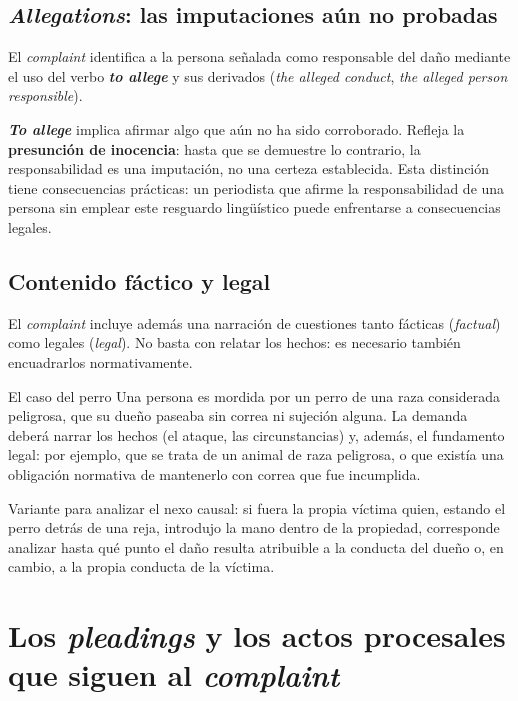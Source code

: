 \documentclass[12pt,oneside]{book}
\begin{document}
\subsection{\textit{Allegations}: las imputaciones aún no probadas}

El \textit{complaint} identifica a la persona señalada como responsable del daño mediante el uso del verbo \textbf{\textit{to allege}} y sus derivados (\textit{the alleged conduct}, \textit{the alleged person responsible}).

\begin{important}
\textbf{\textit{To allege}} implica afirmar algo que aún no ha sido corroborado. Refleja la \textbf{presunción de inocencia}: hasta que se demuestre lo contrario, la responsabilidad es una imputación, no una certeza establecida. Esta distinción tiene consecuencias prácticas: un periodista que afirme la responsabilidad de una persona sin emplear este resguardo lingüístico puede enfrentarse a consecuencias legales.
\end{important}

\subsection{Contenido fáctico y legal}

El \textit{complaint} incluye además una narración de cuestiones tanto fácticas (\textit{factual}) como legales (\textit{legal}). No basta con relatar los hechos: es necesario también encuadrarlos normativamente.

\begin{example}{El caso del perro}
Una persona es mordida por un perro de una raza considerada peligrosa, que su dueño paseaba sin correa ni sujeción alguna. La demanda deberá narrar los hechos (el ataque, las circunstancias) y, además, el fundamento legal: por ejemplo, que se trata de un animal de raza peligrosa, o que existía una obligación normativa de mantenerlo con correa que fue incumplida.

Variante para analizar el nexo causal: si fuera la propia víctima quien, estando el perro detrás de una reja, introdujo la mano dentro de la propiedad, corresponde analizar hasta qué punto el daño resulta atribuible a la conducta del dueño o, en cambio, a la propia conducta de la víctima.
\end{example}

\section{Los \textit{pleadings} y los actos procesales que siguen al \textit{complaint}}
\end{document}
